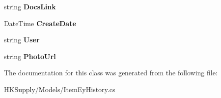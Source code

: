 \begin{DoxyCompactItemize}
\item 
\mbox{\label{class_h_k_supply_1_1_models_1_1_item_ey_history_aad1fb8458263b12e90947cb84cd1c9fa}} 
string {\bfseries Docs\+Link}
\item 
\mbox{\label{class_h_k_supply_1_1_models_1_1_item_ey_history_af8a4bb7a6528639790dfac9aa70e492b}} 
Date\+Time {\bfseries Create\+Date}
\item 
\mbox{\label{class_h_k_supply_1_1_models_1_1_item_ey_history_aca1e8a6201c166307680ad4f5238bc17}} 
string {\bfseries User}
\item 
\mbox{\label{class_h_k_supply_1_1_models_1_1_item_ey_history_a3ccaf3458c37a9f38859d143aa98503e}} 
string {\bfseries Photo\+Url}
\end{DoxyCompactItemize}


The documentation for this class was generated from the following file\+:\begin{DoxyCompactItemize}
\item 
H\+K\+Supply/\+Models/Item\+Ey\+History.\+cs\end{DoxyCompactItemize}
